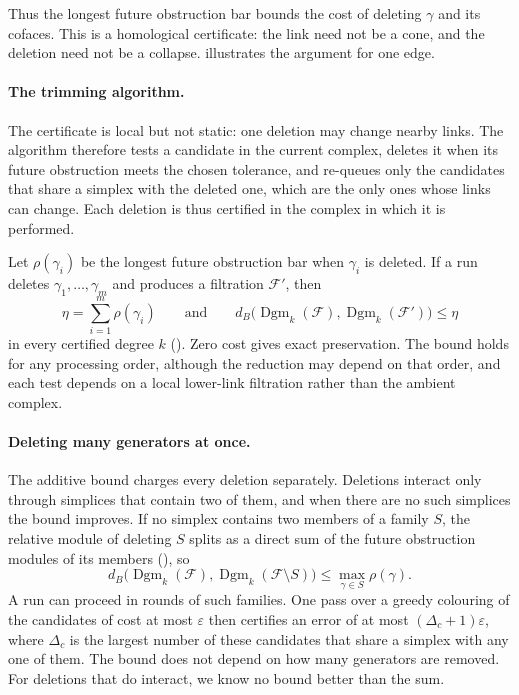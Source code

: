 \documentclass[11pt,letterpaper]{article}
\theoremstyle{definition}
\newcommand{\Dgm}{\operatorname{Dgm}}
\newcommand{\eps}{\varepsilon}
\begin{document}
Thus the longest future obstruction bar bounds the cost of deleting $\gamma$
and its cofaces. This is a homological certificate: the link need not be a
cone, and the deletion need not be a collapse.  illustrates
the argument for one edge.

\paragraph{The trimming algorithm.}
The certificate is local but not static: one deletion may change nearby
links. The algorithm therefore tests a candidate in the current complex,
deletes it when its future obstruction meets the chosen tolerance, and
re-queues only the candidates that share a simplex with the deleted one, which
are the only ones whose links can change. Each deletion is thus certified in
the complex in which it is performed.

Let $\rho(\gamma_i)$ be the longest future obstruction bar when
$\gamma_i$ is deleted. If a run deletes
$\gamma_1,\ldots,\gamma_m$ and produces a filtration $\mathcal F'$, then
$$
\eta=\sum_{i=1}^m\rho(\gamma_i)
\qquad\text{and}\qquad
d_B\bigl(\Dgm_k(\mathcal F),\Dgm_k(\mathcal F')\bigr)\leq\eta
$$
in every certified degree $k$ (). Zero cost gives
exact preservation. The bound holds for any processing order, although the
reduction may depend on that order, and each test depends on a local lower-link
filtration rather than the ambient complex.

\paragraph{Deleting many generators at once.}
The additive bound charges every deletion separately. Deletions interact only
through simplices that contain two of them, and when there are no such
simplices the bound improves. If no simplex contains two members of a family
$S$, the relative module of deleting $S$ splits as a direct sum of the future
obstruction modules of its members (), so
$$
d_B\bigl(\Dgm_k(\mathcal F),\Dgm_k(\mathcal F\setminus S)\bigr)
\leq\max_{\gamma\in S}\rho(\gamma).
$$
A run can proceed in rounds of such families. One pass over a greedy
colouring of the candidates of cost at most $\eps$ then certifies an error of
at most $(\Delta_c+1)\eps$, where $\Delta_c$ is the largest number of these
candidates that share a simplex with any one of them. The
bound does not depend on how many generators are removed. For deletions that
do interact, we know no bound better than the sum.
\end{document}
